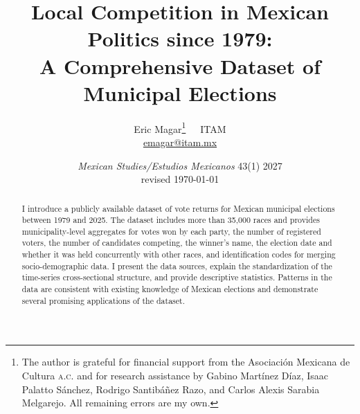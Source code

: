 \documentclass[letter,12pt]{article}
\begin{document}
\title{Local Competition in Mexican Politics since 1979: \\ A Comprehensive Dataset of Municipal Elections}
\author{Eric Magar\footnote{The author is grateful for financial support from the Asociación Mexicana de Cultura \textsc{a.c.} and for research assistance by Gabino Martínez Díaz, Isaac Palatto Sánchez, Rodrigo Santibáñez Razo, and Carlos Alexis Sarabia Melgarejo. All remaining errors are my own.}~~~ITAM \\ \url{emagar@itam.mx}}
\date{\emph{Mexican Studies/Estudios Mexicanos} 43(1) 2027 \\ revised \today}
\maketitle

\begin{abstract}
\noindent I introduce a publicly available dataset of vote returns for Mexican municipal elections between 1979 and 2025. The dataset includes more than 35,000 races and provides municipality-level aggregates for votes won by each party, the number of registered voters, the number of candidates competing, the winner's name, the election date and whether it was held concurrently with other races, and identification codes for merging socio-demographic data. I present the data sources, explain the standardization of the time-series cross-sectional structure, and provide descriptive statistics. Patterns in the data are consistent with existing knowledge of Mexican elections and demonstrate several promising applications of the dataset.
\end{abstract}
\end{document}
